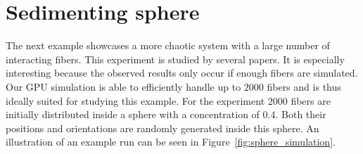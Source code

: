 \documentclass[a4paper,11pt]{kth-mag}
\begin{document}
\section{Sedimenting sphere}
\label{sec:example_sphere}

The next example showcases a more chaotic system with a large number of interacting fibers. This experiment is studied by several papers\cite{Metzger2007}\cite{Park2010}\cite{Bulow2015}. It is especially interesting because the observed results only occur if enough fibers are simulated. Our GPU simulation is able to efficiently handle up to $2000$ fibers and is thus ideally suited for studying this example. For the experiment $2000$ fibers are initially distributed inside a sphere with a concentration of $0.4$. Both their positions and orientations are randomly generated inside this sphere. An illustration of an example run can be seen in Figure~\ref{fig:sphere_simulation}.
\end{document}
